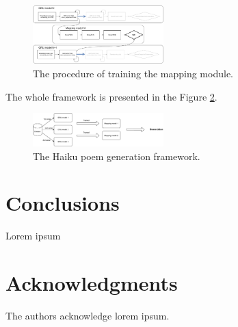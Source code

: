 \documentclass{acm_proc_article-sp}
\begin{document}
\begin{figure}[h!]
	\centering
	\includegraphics[width=0.45\textwidth]{flowchart/training.pdf}
    \caption[The procedure of training the mapping module.]{The procedure of training the mapping module.}
    \label{fig:training}
\end{figure}

The whole framework is presented in the Figure \ref{fig:fw}.

\begin{figure}[h!]
	\centering
	\includegraphics[width=0.45\textwidth]{flowchart/fw.pdf}
    \caption[The Haiku poem generation framework.]{The Haiku poem generation framework.}
    \label{fig:fw}
\end{figure}

\section{Conclusions}

Lorem ipsum

\section{Acknowledgments}

The authors acknowledge lorem ipsum.





\balancecolumns
\end{document}
